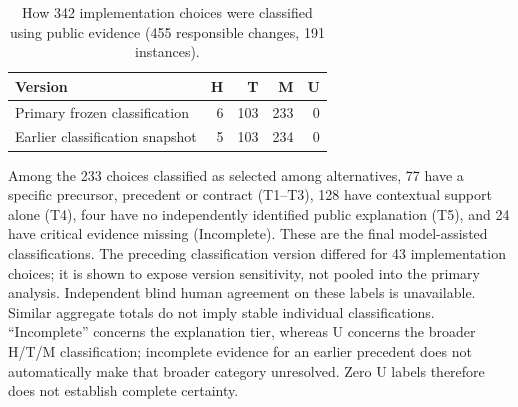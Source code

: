 \begin{table}[H]
\caption{How 342 implementation choices were classified using public evidence (455 responsible changes, 191 instances).}
\label{tab:routes}
\small
\begin{tabular}{@{}lrrrr@{}}
\toprule
\textbf{Version} & \textbf{H} & \textbf{T} & \textbf{M} & \textbf{U}\\
\midrule
Primary frozen classification & 6 & 103 & 233 & 0\\
Earlier classification snapshot & 5 & 103 & 234 & 0\\
\bottomrule
\end{tabular}
\par\smallskip\raggedright\footnotesize Among the 233 choices classified as selected among alternatives, 77 have a specific precursor, precedent or contract (T1--T3), 128 have contextual support alone (T4), four have no independently identified public explanation (T5), and 24 have critical evidence missing (Incomplete). These are the final model-assisted classifications. The preceding classification version differed for 43 implementation choices; it is shown to expose version sensitivity, not pooled into the primary analysis. Independent blind human agreement on these labels is unavailable. Similar aggregate totals do not imply stable individual classifications. ``Incomplete'' concerns the explanation tier, whereas U concerns the broader H/T/M classification; incomplete evidence for an earlier precedent does not automatically make that broader category unresolved. Zero U labels therefore does not establish complete certainty.
\end{table}


